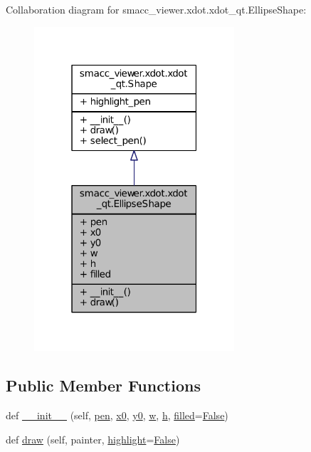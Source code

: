 Collaboration diagram for smacc\+\_\+viewer.\+xdot.\+xdot\+\_\+qt.\+Ellipse\+Shape\+:
\nopagebreak
\begin{figure}[H]
\begin{center}
\leavevmode
\includegraphics[width=211pt]{classsmacc__viewer_1_1xdot_1_1xdot__qt_1_1EllipseShape__coll__graph}
\end{center}
\end{figure}
\subsection*{Public Member Functions}
\begin{DoxyCompactItemize}
\item 
def \hyperlink{classsmacc__viewer_1_1xdot_1_1xdot__qt_1_1EllipseShape_a5eb79f5be5489e131d5d109ed3ec1eda}{\+\_\+\+\_\+init\+\_\+\+\_\+} (self, \hyperlink{classsmacc__viewer_1_1xdot_1_1xdot__qt_1_1EllipseShape_a6423219aa041c492b80be25bd4f54753}{pen}, \hyperlink{classsmacc__viewer_1_1xdot_1_1xdot__qt_1_1EllipseShape_abdb288715129f85135c3e419a9e12959}{x0}, \hyperlink{classsmacc__viewer_1_1xdot_1_1xdot__qt_1_1EllipseShape_a614b6db830bef05d87ca2dd403401e11}{y0}, \hyperlink{classsmacc__viewer_1_1xdot_1_1xdot__qt_1_1EllipseShape_abce028ffaabc33b92349dc8ee873f7e1}{w}, \hyperlink{classsmacc__viewer_1_1xdot_1_1xdot__qt_1_1EllipseShape_af9e9fe2972e06665badea52e53685968}{h}, \hyperlink{classsmacc__viewer_1_1xdot_1_1xdot__qt_1_1EllipseShape_adb6b248e82c0cc5e2bf9338e7faa6196}{filled}=\hyperlink{namespacesmacc__viewer_a5928e8da279785cbab9011356c3eaa87}{False})
\item 
def \hyperlink{classsmacc__viewer_1_1xdot_1_1xdot__qt_1_1EllipseShape_ae098d2bafa7a1aac383cd730ee4bdb33}{draw} (self, painter, \hyperlink{namespacesmacc__viewer_1_1xdot_1_1xdot__qt_ab7970f10809cac5c23ebf9c6badb6d79}{highlight}=\hyperlink{namespacesmacc__viewer_a5928e8da279785cbab9011356c3eaa87}{False})
\end{DoxyCompactItemize}
